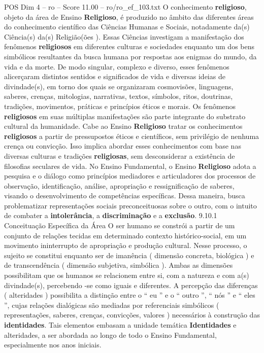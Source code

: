 \begin{textsample}{POS Dim 4 – ro – Score 11.00 – ro/ro\_ef\_103.txt}
O conhecimento \textbf{religioso}, objeto da área de Ensino \textbf{Religioso}, é produzido no âmbito das diferentes áreas do conhecimento científico das Ciências Humanas e Sociais, notadamente da(s) Ciência(s) da(s) Religião(ões ).
Essas Ciências investigam a manifestação dos fenômenos \textbf{religiosos} em diferentes culturas e sociedades enquanto um dos bens simbólicos resultantes da busca humana por respostas aos enigmas do mundo, da vida e da morte.
De modo singular, complexo e diverso, esses fenômenos alicerçaram distintos sentidos e significados de vida e diversas ideias de divindade(s), em torno dos quais se organizaram cosmovisões, linguagens, saberes, crenças, mitologias, narrativas, textos, símbolos, ritos, doutrinas, tradições, movimentos, práticas e princípios éticos e morais.
Os fenômenos \textbf{religiosos} em suas múltiplas manifestações são parte integrante do substrato cultural da humanidade.
Cabe ao Ensino \textbf{Religioso} tratar os conhecimentos \textbf{religiosos} a partir de pressupostos éticos e científicos, sem privilégio de nenhuma crença ou convicção.
Isso implica abordar esses conhecimentos com base nas diversas culturas e tradições \textbf{religiosas}, sem desconsiderar a existência de filosofias seculares de vida.
No Ensino Fundamental, o Ensino \textbf{Religioso} adota a pesquisa e o diálogo como princípios mediadores e articuladores dos processos de observação, identificação, análise, apropriação e ressignificação de saberes, visando o desenvolvimento de competências específicas.
Dessa maneira, busca problematizar representações sociais preconceituosas sobre o outro, com o intuito de combater a \textbf{intolerância}, a \textbf{discriminação} e a \textbf{exclusão}. 9.10.1 Conceituação Específica da Área O ser humano se constrói a partir de um conjunto de relações tecidas em determinado contexto histórico-social, em um movimento ininterrupto de apropriação e produção cultural.
Nesse processo, o sujeito se constitui enquanto ser de imanência ( dimensão concreta, biológica ) e de transcendência ( dimensão subjetiva, simbólica ).
Ambas as dimensões possibilitam que os humanos se relacionem entre si, com a natureza e com a(s) divindade(s), percebendo -se como iguais e diferentes.
A percepção das diferenças ( alteridades ) possibilita a distinção entre o “ eu ” e o “ outro ”, “ nós ” e “ eles ”, cujas relações dialógicas são mediadas por referenciais simbólicos ( representações, saberes, crenças, convicções, valores ) necessários à construção das \textbf{identidades}.
Tais elementos embasam a unidade temática \textbf{Identidades} e alteridades, a ser abordada ao longo de todo o Ensino Fundamental, especialmente nos anos iniciais.

\end{textsample}
